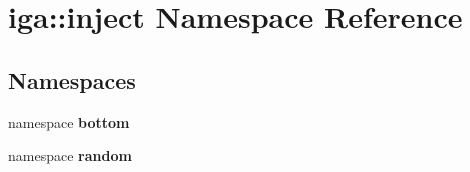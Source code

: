 \section{iga::inject Namespace Reference}
\label{namespaceiga_1_1inject}


\subsection*{Namespaces}
\begin{CompactItemize}
\item 
namespace {\bf bottom}
\item 
namespace {\bf random}
\end{CompactItemize}
